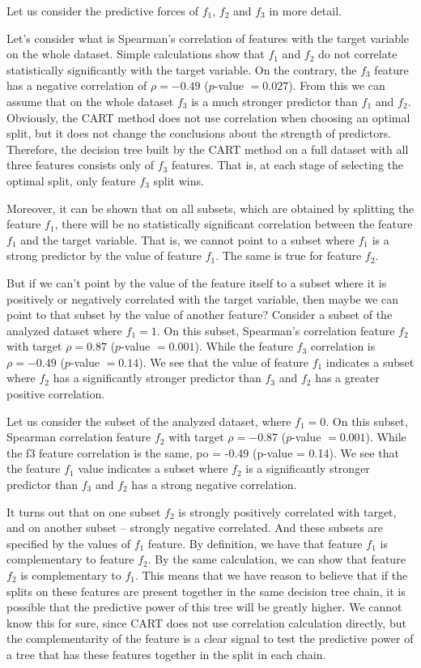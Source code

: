 \documentclass[conference]{IEEEtran}
\theoremstyle{definition}
\begin{document}
Let us consider the predictive forces of $f_1$, $f_2$ and $f_3$ in more detail. 


Let's consider what is Spearman's correlation of features with the target variable on the whole dataset. Simple calculations show that $f_1$ and $f_2$ do not correlate statistically significantly with the target variable. On the contrary, the $f_3$ feature has a negative correlation of $\rho=-0.49$ ($p$-value $=0.027$). From this we can assume that on the whole dataset $f_3$ is a much stronger predictor than $f_1$ and $f_2$. Obviously, the CART method does not use correlation when choosing an optimal split, but it does not change the conclusions about the strength of predictors. Therefore, the decision tree built by the CART method on a full dataset with all three features consists only of $f_3$ features. That is, at each stage of selecting the optimal split, only feature $f_3$ split wins.


Moreover, it can be shown that on all subsets, which are obtained by splitting the feature $f_1$, there will be no statistically significant correlation between the feature $f_1$ and the target variable. That is, we cannot point to a subset where $f_1$ is a strong predictor by the value of feature $f_1$. The same is true for feature $f_2$.


But if we can't point by the value of the feature itself to a subset where it is positively or negatively correlated with the target variable, then maybe we can point to that subset by the value of another feature? Consider a subset of the analyzed dataset where $f_1=1$. On this subset, Spearman's correlation feature $f_2$ with target $\rho = 0.87$ ($p$-value $ = 0.001$). While the feature $f_3$ correlation is $\rho = -0.49$ ($p$-value $ = 0.14$). We see that the value of feature $f_1$ indicates a subset where $f_2$ has a significantly stronger predictor than $f_3$ and $f_2$ has a greater positive correlation. 


Let us consider the subset of the analyzed dataset, where $f_1=0$. On this subset, Spearman correlation feature $f_2$ with target $\rho = -0.87$ ($p$-value $ = 0.001$). While the f3 feature correlation is the same, po = -0.49 (p-value = 0.14). We see that the feature $f_1$ value indicates a subset where $f_2$ is a significantly stronger predictor than $f_3$ and $f_2$ has a strong negative correlation. 


It turns out that on one subset $f_2$ is strongly positively correlated with target, and on another subset -- strongly negative correlated. And these subsets are specified by the values of $f_1$ feature. By definition, we have that feature $f_1$ is complementary to feature $f_2$. By the same calculation, we can show that feature $f_2$ is complementary to $f_1$. This means that we have reason to believe that if the splits on these features are present together in the same decision tree chain, it is possible that the predictive power of this tree will be greatly higher. We cannot know this for sure, since CART does not use correlation calculation directly, but the complementarity of the feature is a clear signal to test the predictive power of a tree that has these features together in the split in each chain. 
\end{document}

